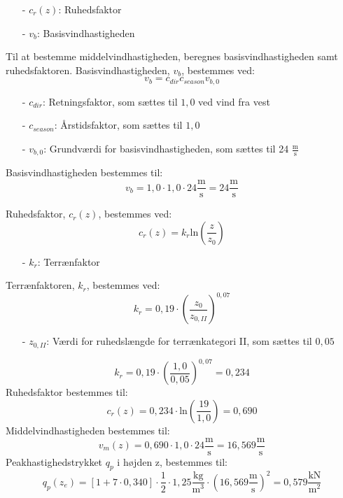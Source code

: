 \begin{itemize}
	\item[-] $c_r(z)$: Ruhedsfaktor
	\item[-] $v_b$: Basisvindhastigheden
\end{itemize}
Til at bestemme middelvindhastigheden, beregnes basisvindhastigheden samt ruhedsfaktoren.
\newline
\newline
Basisvindhastigheden, $v_b$, bestemmes ved:
\begin{equation}
	v_b=c_{dir}c_{season}v_{b,0}
\end{equation}
\begin{itemize}
	\item[-] $c_{dir}$: Retningsfaktor, som sættes til $1,\!0$ ved vind fra vest \citep[ tabel 1a kapitel 4.2]{EU91}
	\item[-] $c_{season}$: Årstidsfaktor, som sættes til $1,\!0$ \citep[ tabel 1b kapitel 4.2]{EU91}
	\item[-] $v_{b,0}$: Grundværdi for basisvindhastigheden, som sættes til 24 $\frac{\text{m}}{\text{s}}$ \citep[ kapitel 4.2]{EU91}
\end{itemize}
Basisvindhastigheden bestemmes til:
\begin{equation}
	v_b=1,\!0\cdot 1,\!0\cdot 24 \frac{\text{m}}{\text{s}}=24 \frac{\text{m}}{\text{s}}
\end{equation}

Ruhedsfaktor, $c_r(z)$, bestemmes ved:
\begin{equation}
	c_r(z)=k_r \text{ln}(\frac{z}{z_0})
\end{equation}
\begin{itemize}
	\item[-] $k_r$: Terrænfaktor
\end{itemize}

Terrænfaktoren, $k_r$, bestemmes ved:
\begin{equation}
	k_r=0,\!19\cdot (\frac{z_0}{z_{0,II}})^{0,07}
\end{equation}

\begin{itemize}
	\item[-] $z_{0,II}$: Værdi for ruhedslængde for terrænkategori II, som sættes til $0,\!05$ \citep[ kapitel 4.3.2]{EU91}
\end{itemize}

\begin{equation}
	k_r=0,\!19\cdot (\frac{1,\!0}{0,\!05})^{0,07}=0,\!234
\end{equation}
Ruhedsfaktor bestemmes til:
\begin{equation}
	c_r(z)=0,\!234\cdot \text{ln}(\frac{19}{1,\!0})=0,\!690
\end{equation}
Middelvindhastigheden bestemmes til:
\begin{equation}
	v_m(z)=0,\!690\cdot 1,\!0\cdot 24 \frac{\text{m}}{\text{s}}=16,\!569 \frac{\text{m}}{\text{s}}
\end{equation}
Peakhastighedstrykket $q_p$ i højden z, bestemmes til:
\begin{equation}
	q_p(z_e)=[1+7\cdot 0,\!340]\cdot \frac{1}{2}\cdot 1,\!25 \frac{\text{kg}}{\text{m}^3}\cdot (16,\!569 \frac{\text{m}}{\text{s}})^2=0,\!579 \frac{\text{kN}}{\text{m}^2}
\end{equation}